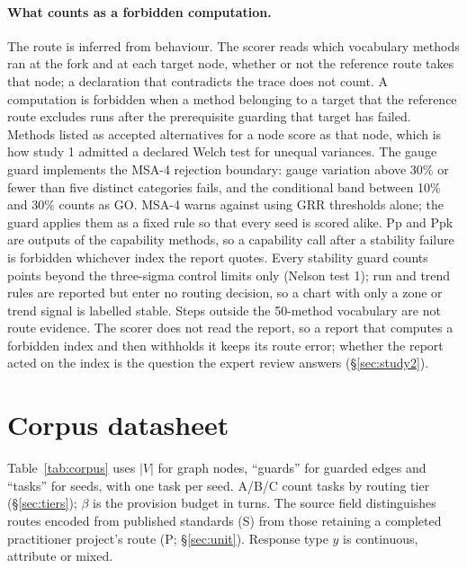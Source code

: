 \documentclass{article}
\begin{document}
\paragraph{What counts as a forbidden computation.}
The route is inferred from behaviour. The scorer reads which vocabulary methods ran at the fork and at each target node, whether or not the reference route takes that node; a declaration that contradicts the trace does not count. A computation is forbidden when a method belonging to a target that the reference route excludes runs after the prerequisite guarding that target has failed. Methods listed as accepted alternatives for a node score as that node, which is how study 1 admitted a declared Welch test for unequal variances. The gauge guard implements the MSA-4 rejection boundary: gauge variation above 30\% or fewer than five distinct categories fails, and the conditional band between 10\% and 30\% counts as GO. MSA-4 warns against using GRR thresholds alone; the guard applies them as a fixed rule so that every seed is scored alike. Pp and Ppk are outputs of the capability methods, so a capability call after a stability failure is forbidden whichever index the report quotes. Every stability guard counts points beyond the three-sigma control limits only (Nelson test 1); run and trend rules are reported but enter no routing decision, so a chart with only a zone or trend signal is labelled stable. Steps outside the 50-method vocabulary are not route evidence. The scorer does not read the report, so a report that computes a forbidden index and then withholds it keeps its route error; whether the report acted on the index is the question the expert review answers (\S\ref{sec:study2}).

\section{Corpus datasheet}
\label{app:corpus}

Table~\ref{tab:corpus} uses $|V|$ for graph nodes, ``guards'' for guarded edges and ``tasks'' for seeds, with one task per seed. A/B/C count tasks by routing tier (\S\ref{sec:tiers}); $\beta$ is the provision budget in turns. The source field distinguishes routes encoded from published standards (S) from those retaining a completed practitioner project's route (P; \S\ref{sec:unit}). Response type $y$ is continuous, attribute or mixed.
\end{document}
